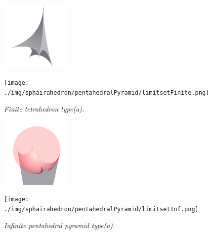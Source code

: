 \documentclass[suppldata, dvipdfmx]{interact}
\theoremstyle{plain}%
\theoremstyle{definition}
\theoremstyle{remark}
\theoremstyle{problemstyle}
\begin{document}
\begin{figure}[H]
 \begin{minipage}{0.5\textwidth}
  \begin{minipage}[t]{0.24\textwidth}
   \centering
   \includegraphics[width=1.35in, height=1.35in, keepaspectratio]{./img/sphairahedron/pentahedralPyramid/sphairahedronFinite.png}
  \end{minipage}
  \hspace*{\fill}
  \begin{minipage}[t]{0.24\textwidth}
   \centering
   \texttt{[image: ./img/sphairahedron/pentahedralPyramid/limitsetFinite.png]}
  \end{minipage}
  \hspace*{\fill}
  \caption{\textit{Finite tetrahedron type(a).}}
  \label{fig:pentahedralPyramidFinite}
 \end{minipage}
 \hspace*{\fill}
 \begin{minipage}{0.5\textwidth}
  \begin{minipage}[t]{0.24\textwidth}
   \centering
   \includegraphics[width=1.35in, height=1.35in, keepaspectratio]{./img/sphairahedron/pentahedralPyramid/sphairahedronInf.png}
  \end{minipage}
  \hspace*{\fill}
  \begin{minipage}[t]{0.24\textwidth}
   \centering
   \texttt{[image: ./img/sphairahedron/pentahedralPyramid/limitsetInf.png]}
  \end{minipage}
  \hspace*{\fill}
  \caption{\textit{Infinite pentahedral pyramid type(a).}}
  \label{fig:pentahedralPyramidInf}
 \end{minipage}
\end{figure}
\end{document}
